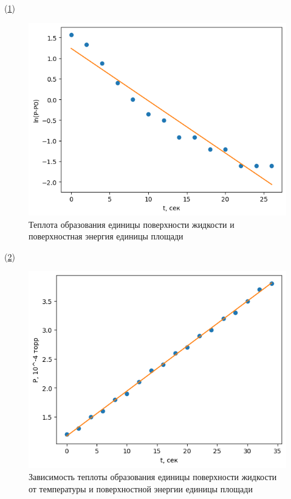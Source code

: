 \documentclass[a4paper,12pt]{article}
\begin{document}
(\ref{data2})
\begin{figure}[H]
    \begin{center}
        \includegraphics[width=\textwidth]{data/plot2.png}
    \end{center}
    \caption{Теплота образования единицы поверхности жидкости и поверхностная энергия единицы площади} \label{data2}
\end{figure}

(\ref{ass})
\begin{figure}[H]
    \begin{center}
        \includegraphics[width=\textwidth]{data/plot3.png}
    \end{center}
    \caption{Зависимость теплоты образования единицы поверхности жидкости от температуры и поверхностной энергии единицы площади} \label{ass}
\end{figure}
\end{document}
